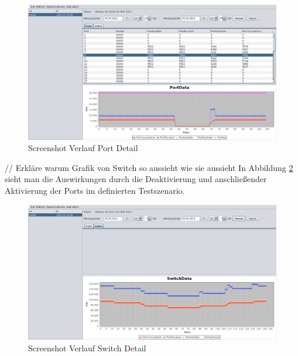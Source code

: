 \begin{figure}[h]
    \centering
    \leavevmode
    \includegraphics[width=1.0\linewidth]{figures/portDetails}
    \caption{Screenshot Verlauf Port Detail}
    \label{fig:portDetails}
\end{figure}

// Erkläre warum Grafik von Switch so aussieht wie sie aussieht
In Abbildung \ref{fig:switchDetails} sieht man die Auswirkungen durch die Deaktivierung und anschließender Aktivierung der Ports im definierten Testszenario.

\begin{figure}[h]
    \centering
    \leavevmode
    \includegraphics[width=1.0\linewidth]{figures/switchDetails}
    \caption{Screenshot Verlauf Switch Detail}
    \label{fig:switchDetails}
\end{figure}

